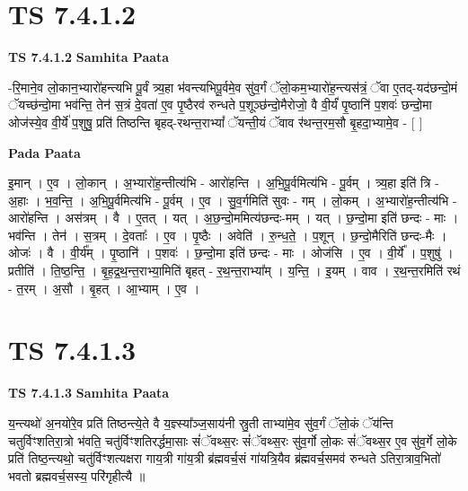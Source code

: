 \documentclass[17pt]{extarticle}
\begin{document}
\section{ TS 7.4.1.2 }

\textbf{TS 7.4.1.2 } \newline
\textbf{Samhita Paata} \newline

-रि॒माने॒व लो॒कान॒भ्यारो॑हन्त्यभि पू॒र्वं त्र्य॒हा भ॑वन्त्यभिपू॒र्वमे॒व सु॑व॒र्गं ॅलो॒कम॒भ्यारो॑ह॒न्त्यस॑त्रं॒ ॅवा ए॒तद्-यद॑छन्दो॒मं ॅयच्छ॑न्दो॒मा भव॑न्ति॒ तेन॑ स॒त्रं दे॒वता॑ ए॒व पृ॒ष्ठैरव॑ रुन्धते प॒शूञ्छ॑न्दो॒मैरोजो॒ वै वी॒र्यं॑ पृ॒ष्ठानि॑ प॒शवः॑ छन्दो॒मा ओज॑स्ये॒व वी॒र्ये॑ प॒शुषु॒ प्रति॑ तिष्ठन्ति बृहद्-रथन्त॒राभ्यां᳚ ॅयन्ती॒यं ॅवाव र॑थन्त॒रम॒सौ बृ॒हदा॒भ्यामे॒व - [  ] \newline

\textbf{Pada Paata} \newline

इ॒मान् । ए॒व । लो॒कान् । अ॒भ्यारो॑ह॒न्तीत्य॑भि - आरो॑हन्ति । अ॒भि॒पू॒र्वमित्य॑भि - पू॒र्वम् । त्र्य॒हा इति॑ त्रि - अ॒हाः । भ॒व॒न्ति॒ । अ॒भि॒पू॒र्वमित्य॑भि - पू॒र्वम् । ए॒व । सु॒व॒र्गमिति॑ सुवः - गम् । लो॒कम् । अ॒भ्यारो॑ह॒न्तीत्य॑भि - आरो॑हन्ति । अस॑त्रम् । वै । ए॒तत् । यत् । अ॒छ॒न्दो॒ममित्य॑छन्दः-मम् । यत् । छ॒न्दो॒मा इति॑ छन्दः - माः । भव॑न्ति । तेन॑ । स॒त्रम् । दे॒वताः᳚ । ए॒व । पृ॒ष्ठैः । अवेति॑ । रु॒न्ध॒ते॒ । प॒शून् । छ॒न्दो॒मैरिति॑ छन्दः-मैः । ओजः॑ । वै । वी॒र्य᳚म् । पृ॒ष्ठानि॑ । प॒शवः॑ । छ॒न्दो॒मा इति॑ छन्दः - माः । ओज॑सि । ए॒व । वी॒र्ये᳚ । प॒शुषु॑ । प्रतीति॑ । ति॒ष्ठ॒न्ति॒ । बृ॒ह॒द्र॒थ॒न्त॒राभ्या॒मिति॑ बृहत् - र॒थ॒न्त॒राभ्या᳚म् । य॒न्ति॒ । इ॒यम् । वाव । र॒थ॒न्त॒रमिति॑ रथं - त॒रम् । अ॒सौ । बृ॒हत् । आ॒भ्याम् । ए॒व ।  \newline





\section{ TS 7.4.1.3 }

\textbf{TS 7.4.1.3 } \newline
\textbf{Samhita Paata} \newline

य॒न्त्यथो॑ अ॒नयो॑रे॒व प्रति॑ तिष्ठन्त्ये॒ते वै य॒ज्ञ्स्या᳚ञ्ज॒साय॑नी स्रु॒ती ताभ्या॑मे॒व सु॑व॒र्गं ॅलो॒कं ॅय॑न्ति चतुर्विꣳशतिरा॒त्रो भ॑वति॒ चतु॑र्विꣳशतिरर्द्धमा॒साः सं॑ॅवथ्स॒रः सं॑ॅवथ्स॒रः सु॑व॒र्गो लो॒कः सं॑ॅवथ्स॒र ए॒व सु॑व॒र्गे लो॒के प्रति॑ तिष्ठ॒न्त्यथो॒ चतु॑र्विꣳशत्यक्षरा गाय॒त्री गा॑य॒त्री ब्र॑ह्मवर्च॒सं गा॑यत्रि॒यैव ब्र॑ह्मवर्च॒समव॑ रुन्धते ऽतिरा॒त्राव॒भितो॑ भवतो ब्रह्मवर्च॒सस्य॒ परि॑गृहीत्यै ॥ \newline
\end{document}
